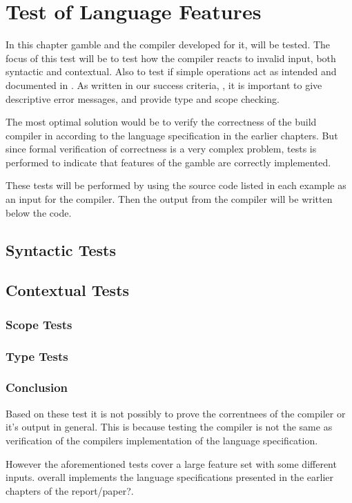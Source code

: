 \chapter{Test of Language Features}
\label{cha:test_of_language_features}
In this chapter \gls{gamble} and the compiler developed for it, will be tested.
The focus of this test will be to test how the compiler reacts to invalid input, both syntactic and contextual.
Also to test if simple operations act as intended and documented in . 
As written in our success criteria, , it is important to give descriptive error messages, and provide type and scope checking. 

The most optimal solution would be to verify the correctness of the build compiler in according to the language specification in the earlier chapters.
But since formal verification of correctness is a very complex problem, tests is performed to indicate that features of the \gls{gamble} are correctly implemented. \citep{Verification} 

These tests will be performed by using the source code listed in each example as an input for the compiler. 
Then the output from the compiler will be written below the code. 

\section{Syntactic Tests}

\section{Contextual Tests}

\subsection*{Scope Tests}
\subsection*{Type Tests}

\subsection*{Conclusion}
Based on these test it is not possibly to prove the correntnees of the compiler or it's output in general.
This is because testing the compiler is not the same as verification of the compilers implementation of the language specification.

However the aforementioned tests cover a large feature set with some different inputs.
overall implements the language specifications presented in the earlier chapters of the report/paper?.
